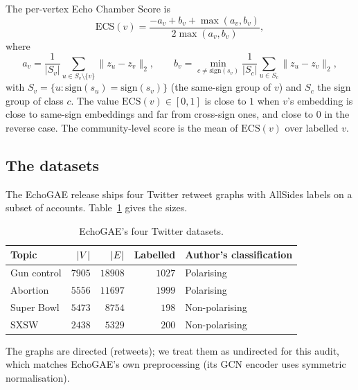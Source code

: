 The per-vertex Echo Chamber Score is
\[
\mathrm{ECS}(v) = \frac{-a_v + b_v + \max(a_v, b_v)}{2 \max(a_v, b_v)},
\]
where
\[
a_v = \frac{1}{|S_v|} \sum_{u \in S_v \setminus \{v\}} \|z_u - z_v\|_2,
\qquad
b_v = \min_{c \neq \mathrm{sign}(s_v)} \frac{1}{|S_c|} \sum_{u \in
S_c} \|z_u - z_v\|_2,
\]
with $S_v = \{u : \mathrm{sign}(s_u) = \mathrm{sign}(s_v)\}$ (the
same-sign group of $v$) and $S_c$ the sign group of class $c$. The
value $\mathrm{ECS}(v) \in [0, 1]$ is close to $1$ when $v$'s
embedding is close to same-sign embeddings and far from cross-sign
ones, and close to $0$ in the reverse case. The community-level score
is the mean of $\mathrm{ECS}(v)$ over labelled $v$.

\subsection{The datasets}

The EchoGAE release ships four Twitter retweet graphs with AllSides
labels on a subset of accounts. Table~\ref{tab:datasets} gives the
sizes.

\begin{center}
\begin{table}[h]
\begin{tabular}{lrrrl}
\hline
Topic & $|V|$ & $|E|$ & Labelled & Author's classification \\
\hline
Gun control  & $7905$ & $18908$ & $1027$ & Polarising \\
Abortion     & $5556$ & $11697$ & $1999$ & Polarising \\
Super Bowl   & $5473$ & $8754$  & $198$  & Non-polarising \\
SXSW         & $2438$ & $5329$  & $200$  & Non-polarising \\
\hline
\end{tabular}
\caption{EchoGAE's four Twitter datasets.}\label{tab:datasets}
\end{table}
\end{center}

The graphs are directed (retweets); we treat them as undirected for
this audit, which matches EchoGAE's own preprocessing (its GCN
encoder uses symmetric normalisation).

